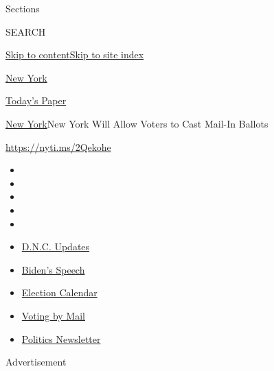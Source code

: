 Sections

SEARCH

\protect\hyperlink{site-content}{Skip to
content}\protect\hyperlink{site-index}{Skip to site index}

\href{https://www.nytimes3xbfgragh.onion/section/nyregion}{New York}

\href{https://myaccount.nytimes3xbfgragh.onion/auth/login?response_type=cookie\&client_id=vi}{}

\href{https://www.nytimes3xbfgragh.onion/section/todayspaper}{Today's
Paper}

\href{/section/nyregion}{New York}\textbar{}New York Will Allow Voters
to Cast Mail-In Ballots

\url{https://nyti.ms/2Qekohe}

\begin{itemize}
\item
\item
\item
\item
\item
\end{itemize}

\begin{itemize}
\item
  \href{https://www.nytimes3xbfgragh.onion/live/2020/08/20/us/dnc-convention-election?action=click\&pgtype=Article\&state=default\&region=TOP_BANNER\&context=storylines_menu}{D.N.C.
  Updates}
\item
  \href{https://www.nytimes3xbfgragh.onion/2020/08/20/us/politics/biden-presidential-nomination-dnc.html?action=click\&pgtype=Article\&state=default\&region=TOP_BANNER\&context=storylines_menu}{Biden's
  Speech}
\item
  \href{https://www.nytimes3xbfgragh.onion/interactive/2019/us/elections/2020-presidential-election-calendar.html?action=click\&pgtype=Article\&state=default\&region=TOP_BANNER\&context=storylines_menu}{Election
  Calendar}
\item
  \href{https://www.nytimes3xbfgragh.onion/interactive/2020/08/11/us/politics/vote-by-mail-us-states.html?action=click\&pgtype=Article\&state=default\&region=TOP_BANNER\&context=storylines_menu}{Voting
  by Mail}
\item
  \href{https://www.nytimes3xbfgragh.onion/newsletters/politics?action=click\&pgtype=Article\&state=default\&region=TOP_BANNER\&context=storylines_menu}{Politics
  Newsletter}
\end{itemize}

Advertisement

